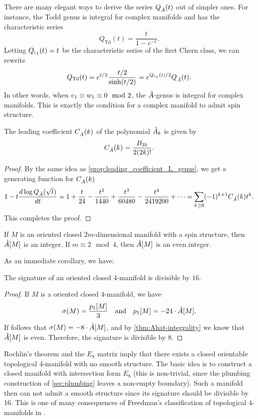 \begin{remark*}
	There are many elegant ways to derive the series $Q_{{\hat{A}}}(t)$ out of simpler ones. For instance, the Todd genus is integral for complex manifolds and has the characteristic series
	\[
		Q_{\mathrm{Td}}(t) = \frac{t}{1-e^{-t}}.
	\]
	Letting $Q_{\mathrm{c}_1}(t)=t$ be the characteristic series of the first Chern class, we can rewrite
	\[
		Q_{\mathrm{Td}}(t) = e^{t/2} \frac{t/2}{\sinh(t/2)} = e^{Q_{\mathrm{c}_1}(t)/2}Q_{{\hat{A}}}(t).
	\]
	In other words, when $\mathrm{c}_1\equiv w_1\equiv 0\mod 2$, the ${\hat{A}}$-genus is integral for complex manifolds. This is exactly the condition for a complex manifold to admit spin structure.
\end{remark*}

\begin{proposition}\label{prop:leading_coefficient_Ahat_genus}
	The leading coefficient $C_{\hat{A}}(k)$ of the polynomial ${\hat{A}}_k$ is given by
	\[
		C_{\hat{A}}(k)=\frac{B_{2k}}{2(2k)!}.
	\]
\end{proposition}
\begin{proof}
	By the same idea as \cref{prop:leading_coefficient_L_genus}, we get a generating function for $C_{\hat{A}}(k)$
	\[
		1-t\frac{d\log Q_{{\hat{A}}}(\sqrt{t})}{dt} = 1+\frac{t}{24}-\frac{t^2}{1440}+\frac{t^3}{60480} - \frac{t^4}{2419200}+\cdots = \sum_{k\geq 0} (-1)^{k+1}C_{\hat{A}}(k) t^k.
	\]
	This completes the proof.
\end{proof}

\begin{theorem}\label{thm:Ahat-integrality}
	If $M$ is an oriented closed $2m$-dimensional manifold with a spin structure, then ${\hat{A}}[M]$ is an integer. If $m\equiv 2\mod 4$, then ${\hat{A}}[M]$ is an even integer.
\end{theorem}

As an immediate corollary, we have:

\begin{theorem}[Rochlin]\label{thm:rochlin}
	The signature of an oriented closed $4$-manifold is divisible by $16$.
\end{theorem}
\begin{proof}
	If $M$ is a oriented closed $4$-manifold, we have
	\[
		\sigma(M) = \frac{p_1[M]}{3}\quad\textrm{and}\quad p_1[M] = -24\cdot{\hat{A}}[M].
	\]
	If follows that $\sigma(M)=-8\cdot{\hat{A}}[M]$, and by \cref{thm:Ahat-integrality} we know that ${\hat{A}}[M]$ is even. Therefore, the signature is divisible by $8$.
\end{proof}

\begin{remark*}\label{rmk:E8-manifold}
	Rochlin's theorem and the $E_8$ matrix imply that there exists a closed orientable topological $4$-manifold with no smooth structure. The basic idea is to construct a closed manifold with intersection form $E_8$ (this is non-trivial, since the plumbing construction of \cref{sec:plumbing} leaves a non-empty boundary).
	Such a manifold then can not admit a smooth structure since its signature should be divisible by 16. This is one of many consequences of Freedman's classification of topological $4$-manifolds in \cite{freedman1982manifold}.
\end{remark*}

